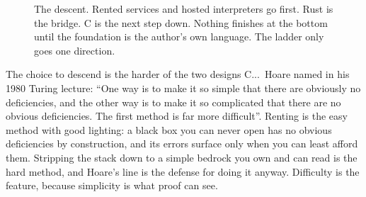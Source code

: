 \documentclass[11pt]{article}
\begin{document}
\begin{figure}[H]
\centering
{}
\caption{The descent. Rented services and hosted interpreters go first.
Rust is the bridge. C is the next step down. Nothing finishes at the
bottom until the foundation is the author's own language. The ladder
only goes one direction.}
\label{fig:ladder}
\end{figure}

The choice to descend is the harder of the two designs
C.\@A.\@R.\ Hoare named in his 1980 Turing lecture: ``One way is to
make it so simple that there are obviously no deficiencies, and the
other way is to make it so complicated that there are no obvious
deficiencies. The first method is far more difficult''\cite{hoare80}.
Renting is the easy method with good lighting: a black box you can
never open has no obvious deficiencies by construction, and its errors
surface only when you can least afford them. Stripping the stack down
to a simple bedrock you own and can read is the hard method, and
Hoare's line is the defense for doing it anyway. Difficulty is the
feature, because simplicity is what proof can see.
\end{document}
